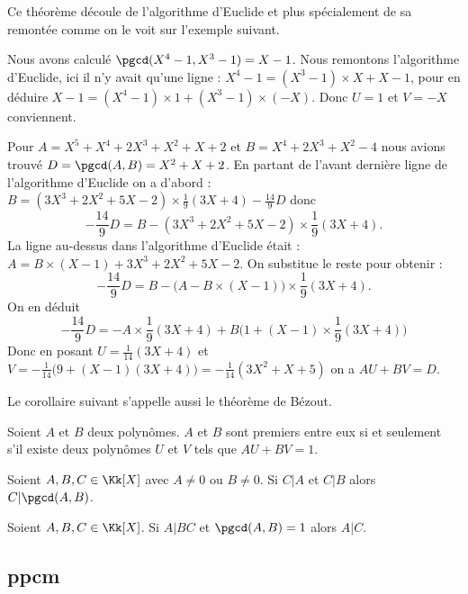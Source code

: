 \documentclass[class=report,crop=false]{standalone}
\begin{document}
Ce théorème découle de l'algorithme d'Euclide et plus spécialement de sa remontée
comme on le voit sur l'exemple suivant.

\begin{exemple}
Nous avons calculé $\pgcd(X^4-1, X^3-1) = X-1$.
Nous remontons l'algorithme d'Euclide, ici il n'y avait qu'une ligne :
$X^4-1  =  (X^3-1) \times X + X-1$, pour en déduire
$X-1 = (X^4-1)\times 1 + (X^3-1) \times (-X)$.
Donc $U=1$ et $V=-X$ conviennent.
\end{exemple}

\begin{exemple}
Pour $A=X^5+X^4+2X^3+X^2+X+2$ et $B=X^4+2X^3+X^2-4$ nous avions trouvé $D= \pgcd(A,B)=X^2+X+2$.
En partant de l'avant dernière ligne de l'algorithme d'Euclide on a d'abord :
 $B  =  (3X^3+2X^2+5X-2)\times \frac19(3X+4) - \frac{14}{9} D$
donc
$$- \frac{14}{9} D = B - (3X^3+2X^2+5X-2)\times \frac19(3X+4).$$
La ligne au-dessus dans l'algorithme d'Euclide était :
$A = B \times (X-1)  + 3X^3+2X^2+5X-2$.
On substitue le reste pour obtenir :
$$- \frac{14}{9} D = B - \big(A-B\times(X-1)\big)\times \frac19(3X+4).$$
On en déduit
$$- \frac{14}{9}D = -A\times \frac19(3X+4) + B\big(1+(X-1)\times \frac19(3X+4)\big)$$
Donc en posant $U=\frac{1}{14}(3X+4)$ et $V= -\frac{1}{14}\big(9+(X-1)(3X+4)\big)=-\frac{1}{14}(3X^2+X+5)$
on a $AU+BV=D$.
\end{exemple}


Le corollaire suivant s'appelle aussi le théorème de Bézout.
\begin{corollaire}
Soient $A$ et $B$ deux polynômes. $A$ et $B$ sont premiers entre eux si
et seulement s'il existe deux polynômes $U$ et $V$ tels que $AU+BV=1$.
\end{corollaire}

\begin{corollaire}
Soient $A, B, C\in \Kk[X]$ avec $A\neq 0$ ou $B\neq 0$.
Si $C|A$ et $C|B$ alors $C|\pgcd(A,B)$.
\end{corollaire}

\begin{corollaire}
Soient $A, B, C\in \Kk[X]$.
Si $A|BC$ et $\pgcd(A,B)=1$ alors $A|C$.
\end{corollaire}



\subsection{ppcm}
\end{document}
